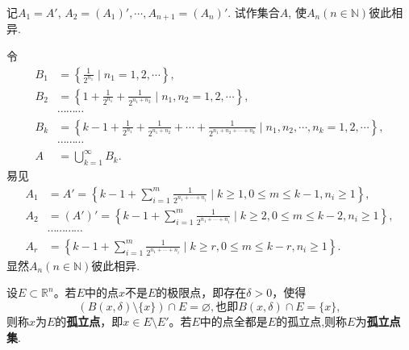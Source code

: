 \documentclass[../../main.tex]{subfiles}%
\begin{document}
\begin{example}
记$A_1 = A'$, $A_2 = (A_1)', \cdots, A_{n+1} = (A_n)'.$ 试作集合$A$, 使$A_n(n \in \mathbb{N})$彼此相异.
\end{example}
\begin{solution}
令
\begin{align*}
B_1 &= \left\{ \frac{1}{2^{n_1}} \mid n_1 = 1,2,\cdots \right\}, \\
B_2 &= \left\{ 1 + \frac{1}{2^{n_1}} + \frac{1}{2^{n_1 + n_2}} \mid n_1, n_2 = 1,2,\cdots \right\}, \\
&\cdots\cdots\cdots \\
B_k &= \left\{ k-1 + \frac{1}{2^{n_1}} + \frac{1}{2^{n_1 + n_2}} + \cdots + \frac{1}{2^{n_1 + n_2 + \cdots + n_k}} \mid n_1, n_2, \cdots, n_k = 1,2,\cdots \right\}, \\
&\cdots\cdots\cdots \\
A &= \bigcup_{k=1}^\infty B_k.
\end{align*}
易见
\begin{align*}
A_1&=A' =\left\{ k-1+\sum_{i=1}^m{\frac{1}{2^{n_1+\cdots +n_i}}}\mid k\geqslant 1,0\leqslant m\leqslant k-1,n_i\geqslant 1 \right\} ,
\\
A_2&=\left( A' \right)' =\left\{ k-1+\sum_{i=1}^m{\frac{1}{2^{n_1+\cdots +n_i}}}\mid k\geqslant 2,0\leqslant m\leqslant k-2,n_i\geqslant 1 \right\} ,
\\
&\cdots \cdots \cdots \cdots 
\\
A_r&=\left\{ k-1+\sum_{i=1}^m{\frac{1}{2^{n_1+\cdots +n_i}}}\mid k\geqslant r,0\leqslant m\leqslant k-r,n_i\geqslant 1 \right\} .
\end{align*}
显然$A_n(n \in \mathbb{N})$彼此相异.

\end{solution}

\begin{definition}[孤立点]\label{definition:孤立点}
设\(E\subset\mathbb{R}^n\)。若\(E\)中的点\(x\)不是\(E\)的极限点，即存在\(\delta>0\)，使得
\[(B(x,\delta)\setminus\{x\})\cap E=\varnothing,\text{也即}B(x,\delta)\cap E=\{x\},
\]
则称\(x\)为\(E\)的\textbf{孤立点}，即\(x\in E\setminus E'\)。若$E$中的点全都是$E$的孤立点,则称$E$为\textbf{孤立点集}.
\end{definition}
\end{document}
